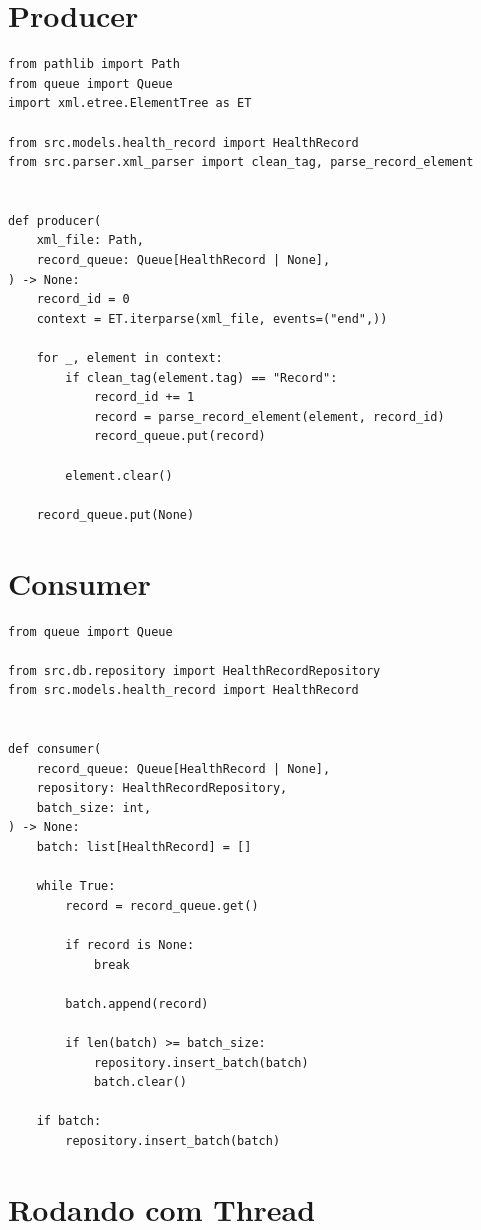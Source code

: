 \section{Producer}

\begin{lstlisting}[style=devbutterpython]
from pathlib import Path
from queue import Queue
import xml.etree.ElementTree as ET

from src.models.health_record import HealthRecord
from src.parser.xml_parser import clean_tag, parse_record_element


def producer(
    xml_file: Path,
    record_queue: Queue[HealthRecord | None],
) -> None:
    record_id = 0
    context = ET.iterparse(xml_file, events=("end",))

    for _, element in context:
        if clean_tag(element.tag) == "Record":
            record_id += 1
            record = parse_record_element(element, record_id)
            record_queue.put(record)

        element.clear()

    record_queue.put(None)
\end{lstlisting}

\section{Consumer}

\begin{lstlisting}[style=devbutterpython]
from queue import Queue

from src.db.repository import HealthRecordRepository
from src.models.health_record import HealthRecord


def consumer(
    record_queue: Queue[HealthRecord | None],
    repository: HealthRecordRepository,
    batch_size: int,
) -> None:
    batch: list[HealthRecord] = []

    while True:
        record = record_queue.get()

        if record is None:
            break

        batch.append(record)

        if len(batch) >= batch_size:
            repository.insert_batch(batch)
            batch.clear()

    if batch:
        repository.insert_batch(batch)
\end{lstlisting}

\section{Rodando com Thread}

